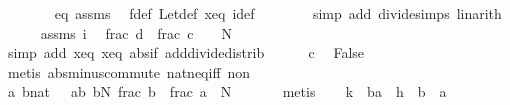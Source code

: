 \begin{isabellebody}
\ \ \ \ \ \ \isamarkupfalse%
\ eq\ assms\ \isamarkupfalse%
\ f{\isacharunderscore}{\kern0pt}def\ Let{\isacharunderscore}{\kern0pt}def\ xeq{\isacharprime}{\kern0pt}\ i{\isacharunderscore}{\kern0pt}def\isanewline
\ \ \ \ \ \ \isamarkupfalse%
\ {\isacharparenleft}{\kern0pt}simp\ add{\isacharcolon}{\kern0pt}\ divide{\isacharunderscore}{\kern0pt}simps{\isacharparenright}{\kern0pt}\ linarith\isanewline
\ \ \ \ \isamarkupfalse%
\ assms\ i\ \isamarkupfalse%
\ {\isachardoublequoteopen}{\isasymbar}frac\ {\isacharparenleft}{\kern0pt}d{\isacharasterisk}{\kern0pt}{\isasymtheta}{\isacharparenright}{\kern0pt}\ {\isacharminus}{\kern0pt}\ frac\ {\isacharparenleft}{\kern0pt}c{\isacharasterisk}{\kern0pt}{\isasymtheta}{\isacharparenright}{\kern0pt}{\isasymbar}\ {\isacharless}{\kern0pt}\ {}\ {\isacharslash}{\kern0pt}\ N{\isachardoublequoteclose}\isanewline
\ \ \ \ \ \ \isamarkupfalse%
\ {\isacharparenleft}{\kern0pt}simp\ add{\isacharcolon}{\kern0pt}\ xeq\ xeq{\isacharprime}{\kern0pt}\ abs{\isacharunderscore}{\kern0pt}if\ add{\isacharunderscore}{\kern0pt}divide{\isacharunderscore}{\kern0pt}distrib{\isacharparenright}{\kern0pt}\isanewline
\ \ \ \ \isamarkupfalse%
\ c\ \isamarkupfalse%
\ False\isanewline
\ \ \ \ \ \ \isamarkupfalse%
\ {\isacharparenleft}{\kern0pt}metis\ abs{\isacharunderscore}{\kern0pt}minus{\isacharunderscore}{\kern0pt}commute\ nat{\isacharunderscore}{\kern0pt}neq{\isacharunderscore}{\kern0pt}iff\ non{\isacharparenright}{\kern0pt}\isanewline
\ \ \isamarkupfalse%
\isanewline
\ \ \isamarkupfalse%
\ \isamarkupfalse%
\ a\ b{\isacharcolon}{\kern0pt}{\isacharcolon}{\kern0pt}nat\ \ {\isacharasterisk}{\kern0pt}{\isacharcolon}{\kern0pt}\ {\isachardoublequoteopen}a{\isacharless}{\kern0pt}b{\isachardoublequoteclose}\ {\isachardoublequoteopen}b{\isasymle}N{\isachardoublequoteclose}\ {\isachardoublequoteopen}{\isasymbar}frac\ {\isacharparenleft}{\kern0pt}b{\isacharasterisk}{\kern0pt}{\isasymtheta}{\isacharparenright}{\kern0pt}\ {\isacharminus}{\kern0pt}\ frac\ {\isacharparenleft}{\kern0pt}a{\isacharasterisk}{\kern0pt}{\isasymtheta}{\isacharparenright}{\kern0pt}{\isasymbar}\ {\isacharless}{\kern0pt}\ {}{\isacharslash}{\kern0pt}N{\isachardoublequoteclose}\ \isanewline
\ \ \ \ \isamarkupfalse%
\ metis\isanewline
\ \ \isamarkupfalse%
\ {\isacharquery}{\kern0pt}k\ {\isacharequal}{\kern0pt}\ {\isachardoublequoteopen}b{\isacharminus}{\kern0pt}a{\isachardoublequoteclose}\ \ {\isacharquery}{\kern0pt}h\ {\isacharequal}{\kern0pt}\ {\isachardoublequoteopen}{\isasymlfloor}b{\isacharasterisk}{\kern0pt}{\isasymtheta}{\isasymrfloor}\ {\isacharminus}{\kern0pt}\ {\isasymlfloor}a{\isacharasterisk}{\kern0pt}{\isasymtheta}{\isasymrfloor}{\isachardoublequoteclose}\isanewline

\end{isabellebody}
